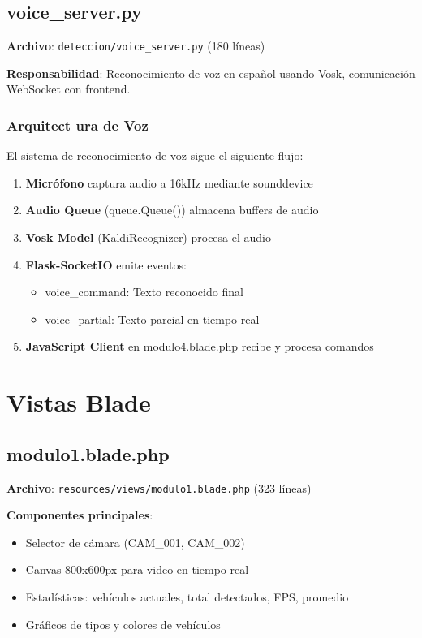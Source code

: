 \subsection{voice\_server.py}

\textbf{Archivo}: \texttt{deteccion/voice\_server.py} (180 líneas)

\textbf{Responsabilidad}: Reconocimiento de voz en español usando Vosk, comunicación WebSocket con frontend.

\subsubsection{Arquitect ura de Voz}

El sistema de reconocimiento de voz sigue el siguiente flujo:

\begin{enumerate}
    \item \textbf{Micrófono} captura audio a 16kHz mediante sounddevice
    \item \textbf{Audio Queue} (queue.Queue()) almacena buffers de audio
    \item \textbf{Vosk Model} (KaldiRecognizer) procesa el audio
    \item \textbf{Flask-SocketIO} emite eventos:
        \begin{itemize}
            \item voice\_command: Texto reconocido final
            \item voice\_partial: Texto parcial en tiempo real
        \end{itemize}
    \item \textbf{JavaScript Client} en modulo4.blade.php recibe y procesa comandos
\end{enumerate}

\newpage

\section{Vistas Blade}

\subsection{modulo1.blade.php}

\textbf{Archivo}: \texttt{resources/views/modulo1.blade.php} (323 líneas)

\textbf{Componentes principales}:
\begin{itemize}
    \item Selector de cámara (CAM\_001, CAM\_002)
    \item Canvas 800x600px para video en tiempo real
    \item Estadísticas: vehículos actuales, total detectados, FPS, promedio
    \item Gráficos de tipos y colores de vehículos
\end{itemize}

